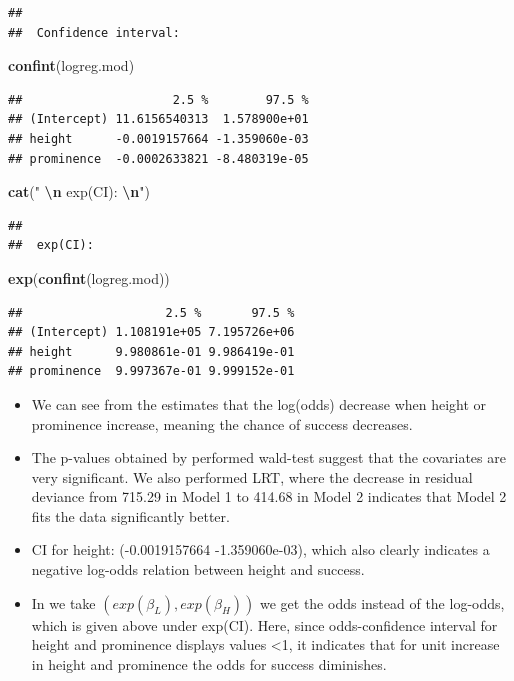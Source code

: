 \documentclass[
]{article}
\newenvironment{Shaded}{\begin{snugshade}}{\end{snugshade}}
\newcommand{\FunctionTok}[1]{\textcolor[rgb]{0.13,0.29,0.53}{\textbf{#1}}}
\newcommand{\NormalTok}[1]{#1}
\newcommand{\SpecialCharTok}[1]{\textcolor[rgb]{0.81,0.36,0.00}{\textbf{#1}}}
\newcommand{\StringTok}[1]{\textcolor[rgb]{0.31,0.60,0.02}{#1}}
\providecommand{\tightlist}{%
  \setlength{\itemsep}{0pt}\setlength{\parskip}{0pt}}
\begin{document}
\begin{verbatim}
##  
##  Confidence interval:
\end{verbatim}

\begin{Shaded}
\begin{Highlighting}[]
\FunctionTok{confint}\NormalTok{(logreg.mod)}
\end{Highlighting}
\end{Shaded}

\begin{verbatim}
##                     2.5 %        97.5 %
## (Intercept) 11.6156540313  1.578900e+01
## height      -0.0019157664 -1.359060e-03
## prominence  -0.0002633821 -8.480319e-05
\end{verbatim}

\begin{Shaded}
\begin{Highlighting}[]
\FunctionTok{cat}\NormalTok{(}\StringTok{" }\SpecialCharTok{\textbackslash{}n}\StringTok{ exp(CI): }\SpecialCharTok{\textbackslash{}n}\StringTok{"}\NormalTok{)}
\end{Highlighting}
\end{Shaded}

\begin{verbatim}
##  
##  exp(CI):
\end{verbatim}

\begin{Shaded}
\begin{Highlighting}[]
\FunctionTok{exp}\NormalTok{(}\FunctionTok{confint}\NormalTok{(logreg.mod))}
\end{Highlighting}
\end{Shaded}

\begin{verbatim}
##                    2.5 %       97.5 %
## (Intercept) 1.108191e+05 7.195726e+06
## height      9.980861e-01 9.986419e-01
## prominence  9.997367e-01 9.999152e-01
\end{verbatim}

\begin{itemize}
\tightlist
\item
  We can see from the estimates that the log(odds) decrease when height or prominence increase, meaning the chance of success decreases.
\item
  The p-values obtained by performed wald-test suggest that the covariates are very significant. We also performed LRT, where the decrease in residual deviance from 715.29 in Model 1 to 414.68 in Model 2 indicates that Model 2 fits the data significantly better.
\item
  CI for height: (-0.0019157664 -1.359060e-03), which also clearly indicates a negative log-odds relation between height and success.
\item
  In we take \((exp(\beta_L), exp(\beta_H))\) we get the odds instead of the log-odds, which is given above under exp(CI). Here, since odds-confidence interval for height and prominence displays values \textless1, it indicates that for unit increase in height and prominence the odds for success diminishes.
\end{itemize}
\end{document}
